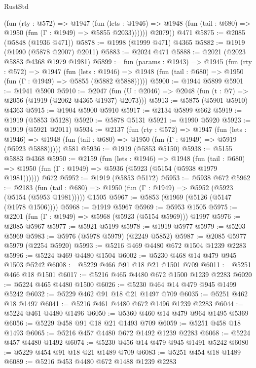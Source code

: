 \begin{lexlean}{RustStd}
\begin{coremodule}
            (fun (rty : @572) =>
            @1947
              (fun (lets : @1946) =>
              @1948 (fun (tail : @680) => @1950 (fun (Γ : @1949) => @5855 @2033))))))
        @2079))
    @471
@5875 := @2085 (@5848 (@1936 @471))
@5878 := @1998 (@1999 @471) @4365
@5882 := @1919 (@1990 (@5878 @2007) @2011)
@5883 := @2024 @471
@5888 := @2021 (@2023 @5883 @4368 @1979 @1981)
@5899 := fun (params : @1943) =>
  @1945
    (fun (rty : @572) =>
    @1947
      (fun (lets : @1946) =>
      @1948 (fun (tail : @680) => @1950 (fun (Γ : @1949) => @5855 (@5882 @5888)))))
@5900 := @1944 @5899
@5901 := @1941 @5900
@5910 := @2047 (fun (U : @2046) => @2048 (fun (t : @7) => @2056 (@1919 (@2062 @4365 @1937) @2073)))
@5913 := @5875 (@5901 @5910) @4363
@5915 := @1904 @5900 @5910
@5917 := @2134 @5899 @662
@5919 := @1919 (@5853 @5128)
@5920 := @5878 @5131
@5921 := @1990 @5920
@5923 := @1919 (@5921 @2011)
@5934 := @2137
    (fun (rty : @572) =>
    @1947
      (fun (lets : @1946) =>
      @1948 (fun (tail : @680) => @1950 (fun (Γ : @1949) => @5919 (@5923 @5888)))))
    @581
@5936 := @1919 (@5853 @5150)
@5938 := @5155 @5883 @4368
@5950 := @2159
    (fun (lets : @1946) =>
    @1948
      (fun (tail : @680) => @1950 (fun (Γ : @1949) => @5936 (@5923 (@5154 (@5938 @1979 @1981))))))
    @672
@5952 := @1919 (@5853 @5172)
@5953 := @5938 @672
@5962 := @2183
    (fun (tail : @680) => @1950 (fun (Γ : @1949) => @5952 (@5923 (@5154 (@5953 @1981)))))
    @1505
@5967 := @5853 (@1969 (@5126 (@5147 (@1978 @1506))))
@5968 := @1919 @5967
@5969 := @5953 @1505
@5975 := @2201 (fun (Γ : @1949) => @5968 (@5923 (@5154 @5969))) @1997
@5976 := @2085 @5967
@5977 := @5921 @5199
@5978 := @1919 @5977
@5979 := @5203 @5969
@5983 := @5976 (@5978 @5979) (@2249 @5852)
@5987 := @2085 @5977 @5979 (@2254 @5920)
@5993 := @5216 @469 @4480 @672 @1504 @1239 @2283
@5996 := @5224 @469 @4480 @1504
@6002 := @5230 @468 @14 @479 @945 @1503 @5242
@6008 := @5229 @466 @91 @18 @21 @1501 @709
@6011 := @5251 @466 @18 @1501
@6017 := @5216 @465 @4480 @672 @1500 @1239 @2283
@6020 := @5224 @465 @4480 @1500
@6026 := @5230 @464 @14 @479 @945 @1499 @5242
@6032 := @5229 @462 @91 @18 @21 @1497 @709
@6035 := @5251 @462 @18 @1497
@6041 := @5216 @461 @4480 @672 @1496 @1239 @2283
@6044 := @5224 @461 @4480 @1496
@6050 := @5360 @460 @14 @479 @964 @1495 @5369
@6056 := @5229 @458 @91 @18 @21 @1493 @709
@6059 := @5251 @458 @18 @1493
@6065 := @5216 @457 @4480 @672 @1492 @1239 @2283
@6068 := @5224 @457 @4480 @1492
@6074 := @5230 @456 @14 @479 @945 @1491 @5242
@6080 := @5229 @454 @91 @18 @21 @1489 @709
@6083 := @5251 @454 @18 @1489
@6089 := @5216 @453 @4480 @672 @1488 @1239 @2283

\end{coremodule}
\end{lexlean}
